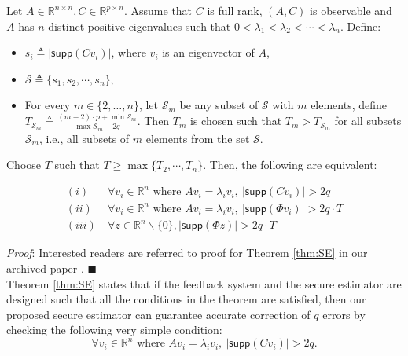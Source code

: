 \documentclass[../../thesis.tex]{subfiles}
\begin{document}
\begin{theorem}\label{thm:SE} 
Let $A \in \mathbb{R}^{n\times n}, C \in \mathbb{R}^{p\times n}$. Assume that $C$ is full rank, $(A,C)$ is observable and $A$ has $n$ distinct positive eigenvalues such that $0 < \lambda_1 < \lambda_2 < \cdots < \lambda_n$. 
Define:
\begin{itemize}
\item
$s_i \triangleq \lvert \textsf{supp} (Cv_i) \vert$, where $v_i$ is an eigenvector of $A$, 
\item
$\mathcal{S} \triangleq \{ s_1, s_2, \cdots, s_n \}$,
\item
For every $m \in \{2, \ldots, n\}$, let $\mathcal{S}_m$ be any subset of $\mathcal{S}$ with $m$ elements, define $T_{\mathcal{S}_m} \triangleq \frac {  (m-2) \cdot p + \min \mathcal{S}_m } {\max \mathcal{S}_m - 2q }$.
Then $T_m$ is chosen such that $T_m > T_{\mathcal{S}_m}$ for all subsets $\mathcal{S}_m$, i.e., all subsets of $m$ elements from the set $\mathcal{S}$.
\end{itemize}

Choose $T$ such that  $T \ge \max \{ T_2, \cdots, T_n \}$.
Then, the following are equivalent:

\begin{equation}
\begin{aligned} 
 (i)  &~\forall v_i \in \mathbb{R}^n \text{ where } Av_i =\lambda_i v_i, ~ \lvert \textsf{supp}(Cv_i) \rvert > 2q  \\
  (ii)  &~\forall v_i \in \mathbb{R}^n \text{ where } Av_i =\lambda_i v_i,  ~\lvert \textsf{supp} (\Phi v_i) \rvert > 2q \cdot T  \\
  (iii) &~  \forall z \in \mathbb{R}^n\backslash \{0 \}, \lvert \textsf{supp} (\Phi z) \rvert > 2 q \cdot T  \nonumber %
\label{eq:new_condition}
\end{aligned}
\end{equation}
\end{theorem}

\textit{Proof}:
Interested readers are referred to proof for Theorem \ref{thm:SE} in our archived paper \cite{Chang:2017}.
\hfill$\blacksquare$\\

Theorem \ref{thm:SE} states that if the feedback system and the secure estimator are designed such that all the conditions in the theorem are satisfied, then our proposed secure estimator can guarantee accurate correction of $q$ errors by checking the following very simple condition:
\begin{equation}\label{eq:distinct}
\forall v_i \in \mathbb{R}^n \text{ where } Av_i =\lambda_i v_i, ~ \lvert \textsf{supp}(Cv_i) \rvert > 2q.  %
\end{equation}
\end{document}
